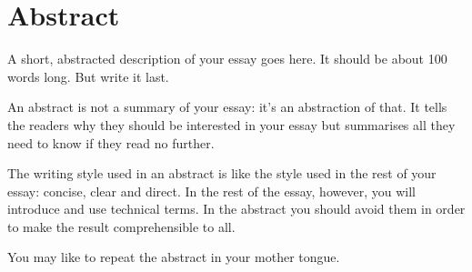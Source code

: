
\chapter*{Abstract} 
A short, abstracted description of your essay goes here. 
It should be about 100 words long. But write it last.

An abstract is not a summary of your essay: it's an abstraction of that. 
It tells the readers why they should be interested in your essay but summarises all
they need to know if they read no further.

The writing style used in an abstract is like the style used in the rest of your essay: concise, clear and direct. 
In the rest of the essay, however, you will introduce and use technical terms. In the abstract you should
avoid them in order to make the result comprehensible to all.

You may like to repeat the abstract in your mother tongue.





